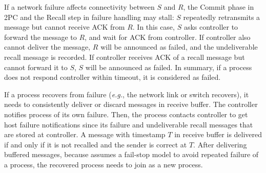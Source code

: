  If a network failure affects connectivity between $S$ and $R$, the Commit phase in 2PC and the Recall step in failure handling may stall: $S$ repeatedly retransmits a message but cannot receive ACK from $R$. In this case, $S$ asks controller to forward the message to $R$, and wait for ACK from controller. If controller also cannot deliver the message, $R$ will be announced as failed, and the undeliverable recall message is recorded. If controller receives ACK of a recall message but cannot forward it to $S$, $S$ will be announced as failed. In summary, if a process does not respond controller within timeout, it is considered as failed.

 If a process recovers from failure (\emph{e.g.}, the network link or switch recovers), it needs to consistently deliver or discard messages in receive buffer. The controller notifies process of its own failure. Then, the process contacts controller to get host failure notifications since its failure and undeliverable recall messages that are stored at controller. A message with timestamp $T$ in receive buffer is delivered if and only if it is not recalled and the sender is correct at $T$. After delivering buffered messages, because \sys{} assumes a fail-stop model to avoid repeated failure of a process, the recovered process needs to join \sys{} as a new process.






